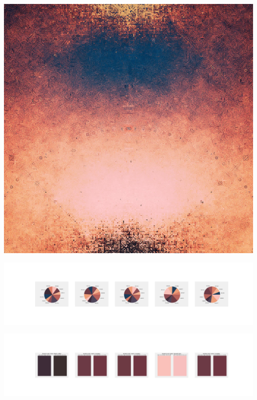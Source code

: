 \documentclass[11pt]{article}
\begin{document}
\begin{landscape}
    \begin{center}
    \includegraphics[width=\textwidth]{./nbimg/file (311).jpg}
    \end{center}

    \begin{center}
    \includegraphics[width=250mm]{./nbimg/pie-236.jpg}
    \end{center}

    \begin{center}
    \includegraphics[width=250mm]{./nbimg/peak-236.jpg}
    \end{center}
    


\end{landscape}
\end{document}
